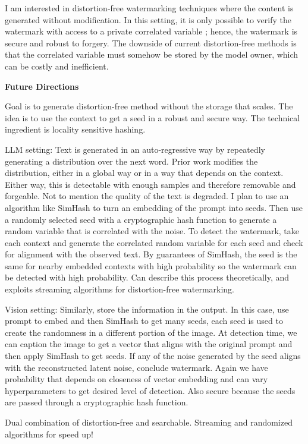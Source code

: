\documentclass[11pt]{article}
\begin{document}
{I am interested in distortion-free watermarking techniques where the content is generated without modification.
In this setting, it is only possible to verify the watermark with access to a private correlated variable \cite{arabi2024hidden}; hence, the watermark is secure and robust to forgery.
The downside of current distortion-free methods is that the correlated variable must somehow be stored by the model owner, which can be costly and inefficient.

{ \large \textbf{Future Directions}}

Goal is to generate distortion-free method without the storage that scales.
The idea is to use the context to get a seed in a robust and secure way.
The technical ingredient is locality sensitive hashing.

LLM setting: Text is generated in an auto-regressive way by repeatedly generating a distribution over the next word.
Prior work modifies the distribution, either in a global way or in a way that depends on the context.
Either way, this is detectable with enough samples and therefore removable and forgeable. Not to mention the quality of the text is degraded.
I plan to use an algorithm like SimHash to turn an embedding of the prompt into seeds.
Then use a randomly selected seed with a cryptographic hash function to generate a random variable that is correlated with the noise.
To detect the watermark, take each context and generate the correlated random variable for each seed and check for alignment with the observed text.
By guarantees of SimHash, the seed is the same for nearby embedded contexts with high probability so the watermark can be detected with high probability.
Can describe this process theoretically, and exploits streaming algorithms for distortion-free watermarking.

Vision setting: Similarly, store the information in the output.
In this case, use prompt to embed and then SimHash to get many seeds, each seed is used to create the randomness in a different portion of the image.
At detection time, we can caption the image to get a vector that aligns with the original prompt and then apply SimHash to get seeds.
If any of the noise generated by the seed aligns with the reconstructed latent noise, conclude watermark.
Again we have probability that depends on closeness of vector embedding and can vary hyperparameters to get desired level of detection.
Also secure because the seeds are passed through a cryptographic hash function.

Dual combination of distortion-free and searchable.
Streaming and randomized algorithms for speed up!

}
\end{document}
